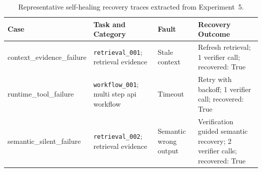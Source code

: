 \begin{table}[H]
\centering
\caption{Representative self-healing recovery traces extracted from Experiment~5.}
\label{tab:case_study_traces}
\footnotesize
\setlength{\tabcolsep}{5pt}
\begin{tabularx}{\textwidth}{L{0.22\textwidth} L{0.22\textwidth} L{0.22\textwidth} Y}
\toprule
\textbf{Case} 
& \textbf{Task and Category} 
& \textbf{Fault} 
& \textbf{Recovery Outcome} \\
\midrule
context_evidence_failure & \texttt{retrieval_001}; retrieval evidence & Stale context & Refresh retrieval; 1 verifier call; recovered: True \\
\midrule
runtime_tool_failure & \texttt{workflow_001}; multi step api workflow & Timeout & Retry with backoff; 1 verifier call; recovered: True \\
\midrule
semantic_silent_failure & \texttt{retrieval_002}; retrieval evidence & Semantic wrong output & Verification guided semantic recovery; 2 verifier calls; recovered: True \\
\bottomrule
\end{tabularx}
\end{table}
